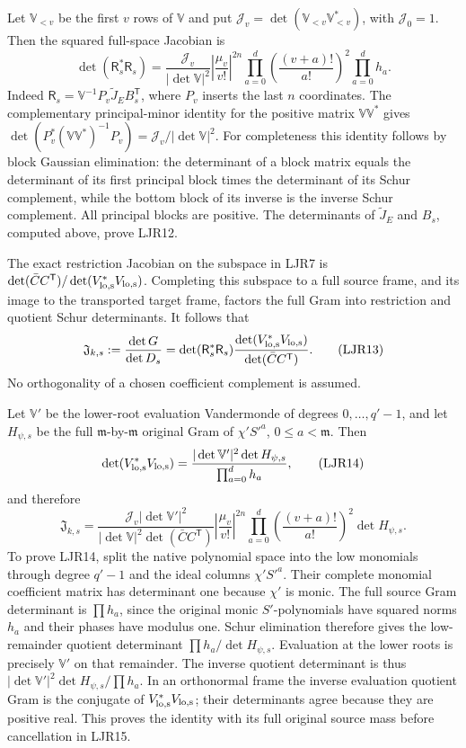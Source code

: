 \documentclass[11pt,a4paper]{article}
\begin{document}
Let $\mathbb V_{<v}$ be the first $v$ rows of $\mathbb V$ and put
$\mathcal J_v=\det(\mathbb V_{<v}\mathbb V_{<v}^*)$, with
$\mathcal J_0=1$. Then the squared full-space Jacobian is
\[
 \det(\mathsf R_s^*\mathsf R_s)
 =\frac{\mathcal J_v}{|\det\mathbb V|^2}
   \left|\frac{\mu_v}{v!}\right|^{2n}
    \prod_{a=0}^{d}\left(\frac{(v+a)!}{a!}\right)^2
    \prod_{a=0}^{d}h_a .
 \tag{LJR12}
\]
Indeed $\mathsf R_s=\mathbb V^{-1}P_v\widetilde J_E
B_s^{\mathsf T}$, where $P_v$ inserts the last $n$ coordinates.
The complementary principal-minor identity for the positive
matrix $\mathbb V\mathbb V^*$ gives
$\det(P_v^*(\mathbb V\mathbb V^*)^{-1}P_v)
=\mathcal J_v/|\det\mathbb V|^2$.
For completeness this identity follows by block Gaussian
elimination: the determinant of a block matrix equals the
determinant of its first principal block times the determinant
of its Schur complement, while the bottom block of its inverse
is the inverse Schur complement. All principal blocks are
positive. The determinants of $\widetilde J_E$ and $B_s$,
computed above, prove LJR12.

The exact restriction Jacobian on the subspace in LJR7 is
$\det(\bar C C^{\mathsf T})/
\det(V_{\rm lo,s}^*V_{\rm lo,s})$.
Completing this subspace to a full source frame, and its image
to the transported target frame, factors the full Gram into
restriction and quotient Schur determinants. It follows that
\[
 \mathfrak J_{k,s}
 :=\frac{\det G}{\det D_s}
 =\det(\mathsf R_s^*\mathsf R_s)
       \frac{\det(V_{\rm lo,s}^*V_{\rm lo,s})}
            {\det(\bar C C^{\mathsf T})}.
 \tag{LJR13}
\]
No orthogonality of a chosen coefficient complement is assumed.

Let $\mathbb V'$ be the lower-root evaluation Vandermonde
of degrees $0,\ldots,q'-1$, and let $H_{\psi,s}$ be the full
$\mathfrak m$-by-$\mathfrak m$ original Gram of
$\chi'S'^a$, $0\le a<\mathfrak m$. Then
\[
 \det(V_{\rm lo,s}^*V_{\rm lo,s})
 =\frac{|\det\mathbb V'|^2\det H_{\psi,s}}
              {\prod_{a=0}^{d}h_a},
 \tag{LJR14}
\]
and therefore
\[
 \boxed{\quad
 \mathfrak J_{k,s}
 =\frac{\mathcal J_v|\det\mathbb V'|^2}
        {|\det\mathbb V|^2\det(\bar C C^{\mathsf T})}
   \left|\frac{\mu_v}{v!}\right|^{2n}
    \prod_{a=0}^{d}\left(\frac{(v+a)!}{a!}\right)^2
        \det H_{\psi,s}.
 \quad}\tag{LJR15}
\]
To prove LJR14, split the native polynomial space into the
low monomials through degree $q'-1$ and the ideal columns
$\chi'S'^a$. Their complete monomial coefficient matrix has
determinant one because $\chi'$ is monic. The full source
Gram determinant is $\prod h_a$, since the original monic
$S'$-polynomials have squared norms $h_a$ and their phases
have modulus one. Schur elimination therefore gives the
low-remainder quotient determinant $\prod h_a/\det H_{\psi,s}$.
Evaluation at the lower roots is precisely $\mathbb V'$
on that remainder. The inverse quotient determinant is thus
$|\det\mathbb V'|^2\det H_{\psi,s}/\prod h_a$.
In an orthonormal frame the inverse evaluation quotient Gram is the conjugate of
$V_{\rm lo,s}^*V_{\rm lo,s}$; their determinants agree because
they are positive real. This proves the identity with its
full original source mass before cancellation in LJR15.
\end{document}
